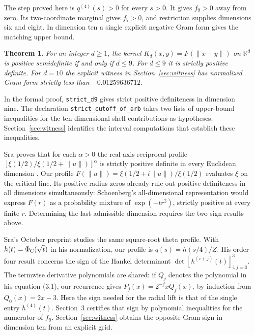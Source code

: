 \documentclass[11pt]{article}
\newtheorem{theorem}{Theorem}
\newcommand{\R}{\mathbb R}
\begin{document}
The step proved here is $q^{(4)}(s)>0$ for every $s>0$. It gives
$f_9>0$ away from zero. Its two-coordinate marginal gives $f_7>0$,
and restriction supplies dimensions six and eight. In dimension ten
a single explicit negative Gram form gives the matching upper bound.

\begin{theorem}\label{thm:main}
For an integer $d\ge1$, the kernel $K_d(x,y)=F(\lVert x-y\rVert)$
on $\R^d$ is positive semidefinite if and only if $d\le9$.
For $d\le9$ it is strictly positive definite. For $d=10$ the explicit
witness in Section~\ref{sec:witness} has normalized Gram form
strictly less than $-0.01259636712$.
\end{theorem}

In the formal proof, \texttt{strict\_d9} gives strict positive
definiteness in dimension nine. The declaration \texttt{strict\_cutoff\_of\_arb}
takes two lists of upper-bound inequalities for the ten-dimensional shell
contributions as hypotheses. Section~\ref{sec:witness} identifies the
interval computations that establish these inequalities.

Sra proves that for each $\alpha>0$ the real-axis reciprocal profile
$[\xi(1/2)/\xi(1/2+\lVert u\rVert)]^\alpha$ is strictly positive definite
in every Euclidean dimension \cite[Theorem 1.1, (1.4)]{Sra}. Our profile
$F(\lVert u\rVert)=\xi(1/2+i\lVert u\rVert)/\xi(1/2)$ evaluates $\xi$
on the critical line. Its positive-radius zeros already rule out
positive definiteness in all dimensions simultaneously: Schoenberg's
all-dimensional representation would express $F(r)$ as a probability
mixture of $\exp(-tr^2)$, strictly positive at every finite $r$.
Determining the last admissible dimension requires the two sign results
above.

Sra's October preprint \cite[Theorem 1.1 and Section 3.1]{SraHankel}
studies the same square-root theta profile. With
$h(t)=\Phi_{\rm C}(\sqrt t)$ in his normalization, our profile is
$q(s)=h(s/4)/Z$. His order-four result concerns the sign of the
Hankel determinant $\det[h^{(i+j)}(t)]_{i,j=0}^{3}$.
The termwise derivative polynomials are shared: if $Q_j$ denotes
the polynomial in his equation (3.1), our recurrence gives
$P_j(x)=2^{-j}xQ_j(x)$, by induction from $Q_0(x)=2x-3$.
Here the sign needed for the radial lift is that of the single entry
$h^{(4)}(t)$. Section~3 certifies that sign by polynomial inequalities
for the numerator of $f_9$. Section~\ref{sec:witness} obtains the
opposite Gram sign in dimension ten from an explicit grid.
\end{document}
